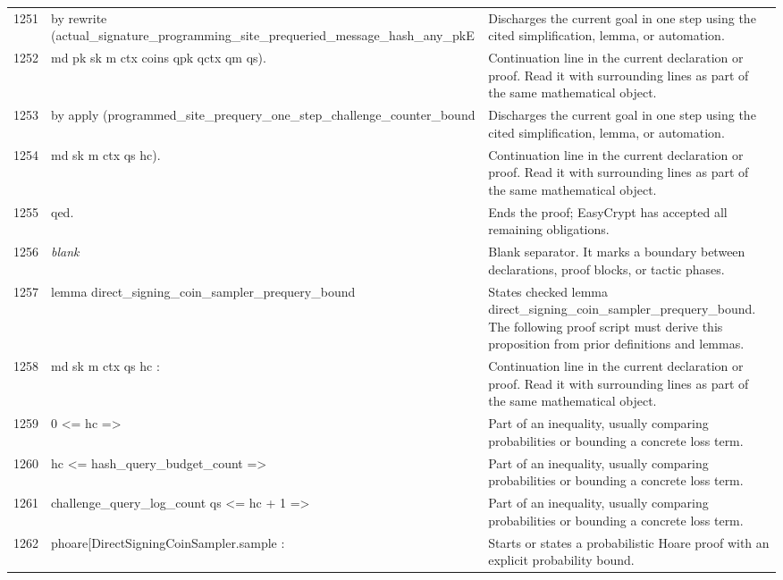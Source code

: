 \documentclass[10pt]{article}
\begin{document}
\begin{longtable}{r L{0.53\textwidth} L{0.37\textwidth}}
1251 & {\ttfamily\scriptsize   by rewrite (actual\_signature\_programming\_site\_prequeried\_message\_hash\_any\_pkE} & Discharges the current goal in one step using the cited simplification, lemma, or automation. \\
1252 & {\ttfamily\scriptsize                 md pk sk m ctx coins qpk qctx qm qs).} & Continuation line in the current declaration or proof.  Read it with surrounding lines as part of the same mathematical object. \\
1253 & {\ttfamily\scriptsize by apply (programmed\_site\_prequery\_one\_step\_challenge\_counter\_bound} & Discharges the current goal in one step using the cited simplification, lemma, or automation. \\
1254 & {\ttfamily\scriptsize             md sk m ctx qs hc).} & Continuation line in the current declaration or proof.  Read it with surrounding lines as part of the same mathematical object. \\
1255 & {\ttfamily\scriptsize qed.} & Ends the proof; EasyCrypt has accepted all remaining obligations. \\
1256 & {\ttfamily\scriptsize \emph{blank}} & Blank separator.  It marks a boundary between declarations, proof blocks, or tactic phases. \\
1257 & {\ttfamily\scriptsize lemma direct\_signing\_coin\_sampler\_prequery\_bound} & States checked lemma direct\_signing\_coin\_sampler\_prequery\_bound.  The following proof script must derive this proposition from prior definitions and lemmas. \\
1258 & {\ttfamily\scriptsize   md sk m ctx qs hc :} & Continuation line in the current declaration or proof.  Read it with surrounding lines as part of the same mathematical object. \\
1259 & {\ttfamily\scriptsize   0 <= hc =>} & Part of an inequality, usually comparing probabilities or bounding a concrete loss term. \\
1260 & {\ttfamily\scriptsize   hc <= hash\_query\_budget\_count =>} & Part of an inequality, usually comparing probabilities or bounding a concrete loss term. \\
1261 & {\ttfamily\scriptsize   challenge\_query\_log\_count qs <= hc + 1 =>} & Part of an inequality, usually comparing probabilities or bounding a concrete loss term. \\
1262 & {\ttfamily\scriptsize   phoare[DirectSigningCoinSampler.sample :} & Starts or states a probabilistic Hoare proof with an explicit probability bound. \\

\end{longtable}
\end{document}
